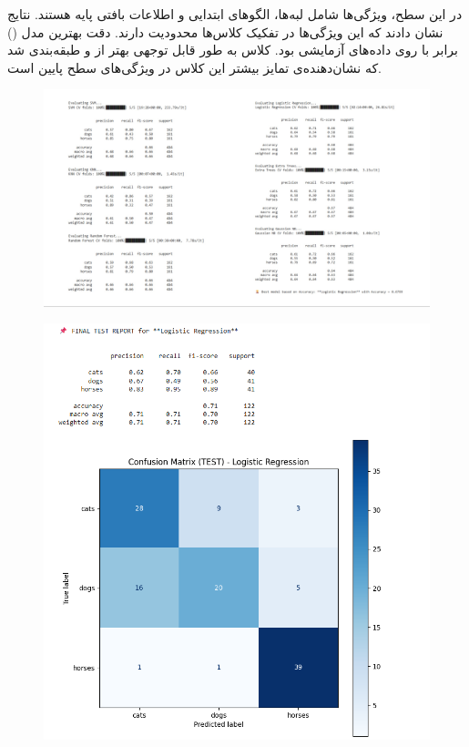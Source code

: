 \documentclass[a4paper,12pt]{article}
\begin{document}
در این سطح، ویژگی‌ها شامل لبه‌ها، الگوهای ابتدایی و اطلاعات بافتی پایه هستند. نتایج نشان دادند که این ویژگی‌ها در تفکیک کلاس‌ها محدودیت دارند. دقت بهترین مدل () برابر با  روی داده‌های آزمایشی بود. کلاس  به طور قابل توجهی بهتر از  و  طبقه‌بندی شد که نشان‌دهنده‌ی تمایز بیشتر این کلاس در ویژگی‌های سطح پایین است.
\begin{figure}[h]
	\centering
	\includegraphics[width=1\textwidth]{1-1.jpg}
\end{figure}
\FloatBarrier
\begin{figure}[h]
	\centering
	\includegraphics[width=1\textwidth]{1-2.png}
\end{figure}
\FloatBarrier
\end{document}
